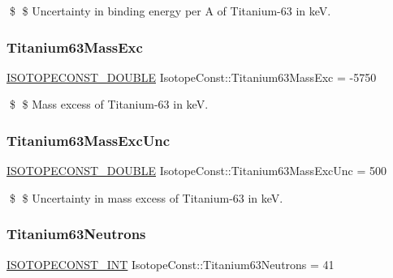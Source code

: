 \$ \$ Uncertainty in binding energy per A of Titanium-\/63 in keV. \mbox{\label{group___isotope_const-_titanium-_ti63_gae9085aaafa1fe5d6ef39520b3ec1a166}} 
\subsubsection{\texorpdfstring{Titanium63\+Mass\+Exc}{Titanium63MassExc}}
{\footnotesize\ttfamily \mbox{\hyperlink{group___isotope_const-_macros_ga8f45a7272ce02c0b4c65c44636ed719a}{I\+S\+O\+T\+O\+P\+E\+C\+O\+N\+S\+T\+\_\+\+D\+O\+U\+B\+LE}} Isotope\+Const\+::\+Titanium63\+Mass\+Exc = -\/5750}

\$ \$ Mass excess of Titanium-\/63 in keV. \mbox{\label{group___isotope_const-_titanium-_ti63_gad2b4b41af896fbe4b8d87a3613d43960}} 
\subsubsection{\texorpdfstring{Titanium63\+Mass\+Exc\+Unc}{Titanium63MassExcUnc}}
{\footnotesize\ttfamily \mbox{\hyperlink{group___isotope_const-_macros_ga8f45a7272ce02c0b4c65c44636ed719a}{I\+S\+O\+T\+O\+P\+E\+C\+O\+N\+S\+T\+\_\+\+D\+O\+U\+B\+LE}} Isotope\+Const\+::\+Titanium63\+Mass\+Exc\+Unc = 500}

\$ \$ Uncertainty in mass excess of Titanium-\/63 in keV. \mbox{\label{group___isotope_const-_titanium-_ti63_ga54da70644a9ab5ef632965539a962629}} 
\subsubsection{\texorpdfstring{Titanium63\+Neutrons}{Titanium63Neutrons}}
{\footnotesize\ttfamily \mbox{\hyperlink{group___isotope_const-_macros_ga5f18360b3e99483a35c32d789e62621c}{I\+S\+O\+T\+O\+P\+E\+C\+O\+N\+S\+T\+\_\+\+I\+NT}} Isotope\+Const\+::\+Titanium63\+Neutrons = 41}

